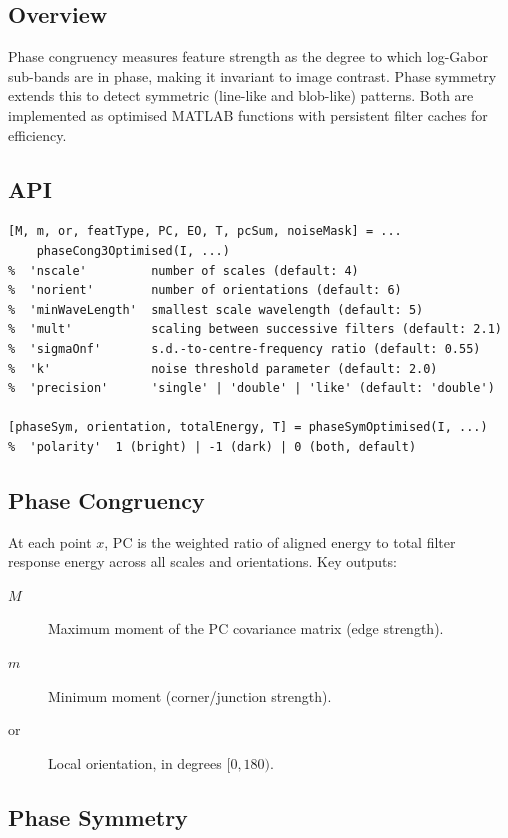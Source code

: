 \documentclass[a4paper,justified]{tufte-book}
\begin{document}
\subsection{Overview}

Phase congruency \cite{Kovesi1999} measures feature strength as the degree to
which log-Gabor sub-bands are in phase, making it invariant to image contrast.
Phase symmetry extends this to detect symmetric (line-like and blob-like)
patterns. Both are implemented as optimised MATLAB functions with persistent
filter caches for efficiency.

\subsection{API}

\begin{lstlisting}
[M, m, or, featType, PC, EO, T, pcSum, noiseMask] = ...
    phaseCong3Optimised(I, ...)
%  'nscale'         number of scales (default: 4)
%  'norient'        number of orientations (default: 6)
%  'minWaveLength'  smallest scale wavelength (default: 5)
%  'mult'           scaling between successive filters (default: 2.1)
%  'sigmaOnf'       s.d.-to-centre-frequency ratio (default: 0.55)
%  'k'              noise threshold parameter (default: 2.0)
%  'precision'      'single' | 'double' | 'like' (default: 'double')

[phaseSym, orientation, totalEnergy, T] = phaseSymOptimised(I, ...)
%  'polarity'  1 (bright) | -1 (dark) | 0 (both, default)
\end{lstlisting}

\subsection{Phase Congruency}

At each point $x$, PC is the weighted ratio of aligned energy to total
filter response energy across all scales and orientations. Key outputs:

\begin{description}
  \item[$M$] Maximum moment of the PC covariance matrix (edge strength).
  \item[$m$] Minimum moment (corner/junction strength).
  \item[$\mathrm{or}$] Local orientation, in degrees $[0, 180)$.
\end{description}

\subsection{Phase Symmetry}
\end{document}
